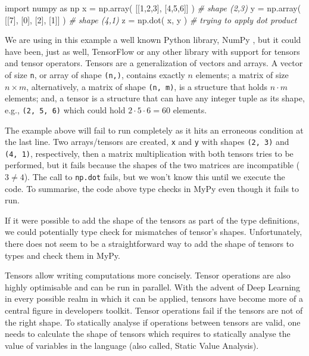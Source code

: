 \documentclass[
11pt, %
english, %
singlespacing, %
headsepline, %
]{MastersDoctoralThesis} %
\newenvironment{Shaded}{}{}
\newcommand{\CommentTok}[1]{\textcolor[rgb]{0.38,0.63,0.69}{\textit{#1}}}
\newcommand{\DecValTok}[1]{\textcolor[rgb]{0.25,0.63,0.44}{#1}}
\newcommand{\ImportTok}[1]{#1}
\newcommand{\NormalTok}[1]{#1}
\newcommand{\OperatorTok}[1]{\textcolor[rgb]{0.40,0.40,0.40}{#1}}
\begin{document}
\begin{Shaded}
\begin{Highlighting}[]
\ImportTok{import}\NormalTok{ numpy }\ImportTok{as}\NormalTok{ np}
\NormalTok{x }\OperatorTok{=}\NormalTok{ np.array( [[}\DecValTok{1}\NormalTok{,}\DecValTok{2}\NormalTok{,}\DecValTok{3}\NormalTok{], [}\DecValTok{4}\NormalTok{,}\DecValTok{5}\NormalTok{,}\DecValTok{6}\NormalTok{]] ) }\CommentTok{# shape (2,3)}
\NormalTok{y }\OperatorTok{=}\NormalTok{ np.array( [[}\DecValTok{7}\NormalTok{], [}\DecValTok{0}\NormalTok{], [}\DecValTok{2}\NormalTok{], [}\DecValTok{1}\NormalTok{]] ) }\CommentTok{# shape (4,1)}
\NormalTok{z }\OperatorTok{=}\NormalTok{ np.dot( x, y ) }\CommentTok{# trying to apply dot product}
\end{Highlighting}
\end{Shaded}

We are using in this example a well known Python library, NumPy
\autocite{oliphant2006guide}, but it could have been, just as well,
TensorFlow \autocite{abadi_tensorflow_2016} or any other library with
support for tensors and tensor operators. Tensors are a generalization
of vectors and arrays. A vector of size \texttt{n}, or array of shape
\texttt{(n,)}, contains exactly \(n\) elements; a matrix of size
\(n \times m\), alternatively, a matrix of shape \texttt{(n,\ m)}, is a
structure that holds \(n \cdot m\) elements; and, a tensor is a
structure that can have any integer tuple as its shape, e.g.,
\texttt{(2,\ 5,\ 6)} which could hold \(2 \cdot 5 \cdot 6 = 60\)
elements.

The example above will fail to run completely as it hits an erroneous
condition at the last line. Two arrays/tensors are created, \texttt{x}
and \texttt{y} with shapes \texttt{(2,\ 3)} and \texttt{(4,\ 1)},
respectively, then a matrix multiplication with both tensors tries to be
performed, but it fails because the shapes of the two matrices are
incompatible (\(3\ne4\)). The call to \texttt{np.dot} fails, but we
won't know this until we execute the code. To summarise, the code above
type checks in MyPy even though it fails to run.

If it were possible to add the shape of the tensors as part of the type
definitions, we could potentially type check for mismatches of tensor's
shapes. Unfortunately, there does not seem to be a straightforward way
to add the shape of tensors to types and check them in MyPy.

Tensors allow writing computations more concisely. Tensor operations are
also highly optimisable and can be run in parallel. With the advent of
Deep Learning in every possible realm in which it can be applied,
tensors have become more of a central figure in developers toolkit.
Tensor operations fail if the tensors are not of the right shape. To
statically analyse if operations between tensors are valid, one needs to
calculate the shape of tensors which requires to statically analyse the
value of variables in the language (also called, Static Value Analysis).
\end{document}
